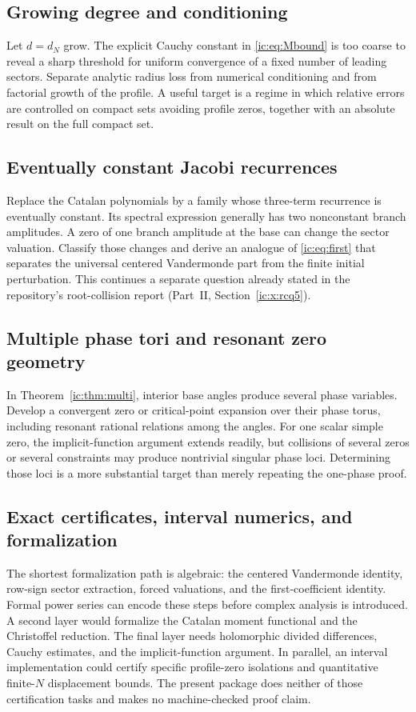 \documentclass[11pt,a4paper]{article}
\numberwithin{equation}{section}
\theoremstyle{definition}
\theoremstyle{remark}
\begin{document}
\subsection{Growing degree and conditioning}
Let $d=d_N$ grow. The explicit Cauchy constant in
\eqref{ic:eq:Mbound} is too coarse to reveal a sharp threshold for uniform
convergence of a fixed number of leading sectors. Separate analytic
radius loss from numerical conditioning and from factorial growth of
the profile. A useful target is a regime in which relative errors are
controlled on compact sets avoiding profile zeros, together with an
absolute result on the full compact set.

\subsection{Eventually constant Jacobi recurrences}\label{ic:x:jacobi}
Replace the Catalan polynomials by a family whose three-term recurrence
is eventually constant. Its spectral expression generally has two
nonconstant branch amplitudes. A zero of one branch amplitude at the
base can change the sector valuation. Classify those changes and derive
an analogue of \eqref{ic:eq:first} that separates the universal centered
Vandermonde part from the finite initial perturbation. This continues a
separate question already stated in the repository's root-collision
report (Part~II, Section~\ref{ic:x:rcq5}).

\subsection{Multiple phase tori and resonant zero geometry}
In Theorem~\ref{ic:thm:multi}, interior base angles produce several phase
variables. Develop a convergent zero or critical-point expansion over
their phase torus, including resonant rational relations among the
angles. For one scalar simple zero, the implicit-function argument
extends readily, but collisions of several zeros or several constraints
may produce nontrivial singular phase loci. Determining those loci is a
more substantial target than merely repeating the one-phase proof.

\subsection{Exact certificates, interval numerics, and formalization}
The shortest formalization path is algebraic: the centered Vandermonde
identity, row-sign sector extraction, forced valuations, and the
first-coefficient identity. Formal power series can encode these steps
before complex analysis is introduced. A second layer would formalize
the Catalan moment functional and the Christoffel reduction. The final
layer needs holomorphic divided differences, Cauchy estimates, and the
implicit-function argument. In parallel, an interval implementation
could certify specific profile-zero isolations and quantitative
finite-$N$ displacement bounds. The present package does neither of
those certification tasks and makes no machine-checked proof claim.
\end{document}

